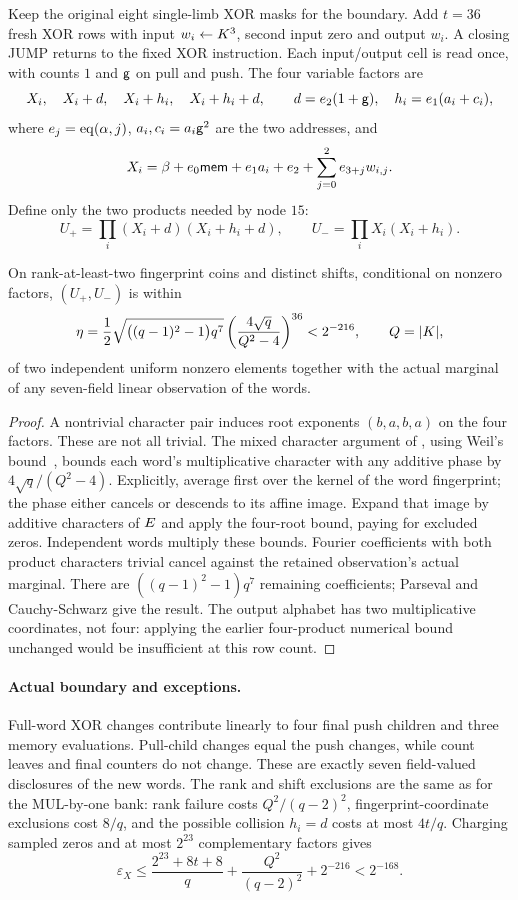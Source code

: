 Keep the original eight single-limb XOR masks for the boundary. Add $t=36$ fresh XOR rows with input $w_i\gets K^3$, second input zero and output $w_i$. A closing JUMP returns to the fixed XOR instruction. Each input/output cell is read once, with counts $1$ and $\mathsf{g}$ on pull and push. The four variable factors are
\[
 X_i,\quad X_i+d,\quad X_i+h_i,\quad X_i+h_i+d,
 \qquad d=e_2(1+\mathsf{g}),\quad h_i=e_1(a_i+c_i),
\]
where $e_j=\operatorname{eq}(\alpha,j)$, $a_i,c_i=a_i\mathsf{g}^2$ are the two addresses, and
\[
 X_i=\beta+e_0\mathsf{mem}+e_1a_i+e_2+
       \sum_{j=0}^2e_{3+j}w_{i,j}.
\]
Define only the two products needed by node $15$:
\[
 U_+=\prod_i(X_i+d)(X_i+h_i+d),\qquad
 U_-=\prod_iX_i(X_i+h_i).
\]

\begin{lemma}
On rank-at-least-two fingerprint coins and distinct shifts, conditional on nonzero factors, $(U_+,U_-)$ is within
\[
 \eta=\frac12\sqrt{\bigl((q-1)^2-1\bigr)q^7}
       \left(\frac{4\sqrt q}{Q^2-4}\right)^{36}<2^{-216},
 \qquad Q=|K|,
\]
of two independent uniform nonzero elements together with the actual marginal of any seven-field linear observation of the words.
\end{lemma}
\begin{proof}
A nontrivial character pair induces root exponents $(b,a,b,a)$ on the four factors. These are not all trivial. The mixed character argument of , using Weil's bound~\cite{winger}, bounds each word's multiplicative character with any additive phase by $4\sqrt q/(Q^2-4)$. Explicitly, average first over the kernel of the word fingerprint; the phase either cancels or descends to its affine image. Expand that image by additive characters of $E$ and apply the four-root bound, paying for excluded zeros. Independent words multiply these bounds. Fourier coefficients with both product characters trivial cancel against the retained observation's actual marginal. There are $((q-1)^2-1)q^7$ remaining coefficients; Parseval and Cauchy-Schwarz give the result. The output alphabet has two multiplicative coordinates, not four: applying the earlier four-product numerical bound unchanged would be insufficient at this row count.
\end{proof}

\paragraph{Actual boundary and exceptions.} Full-word XOR changes contribute linearly to four final push children and three memory evaluations. Pull-child changes equal the push changes, while count leaves and final counters do not change. These are exactly seven field-valued disclosures of the new words. The rank and shift exclusions are the same as for the MUL-by-one bank: rank failure costs $Q^2/(q-2)^2$, fingerprint-coordinate exclusions cost $8/q$, and the possible collision $h_i=d$ costs at most $4t/q$. Charging sampled zeros and at most $2^{23}$ complementary factors gives
\[
 \varepsilon_X\le\frac{2^{23}+8t+8}{q}
             +\frac{Q^2}{(q-2)^2}+2^{-216}<2^{-168}.
\]

